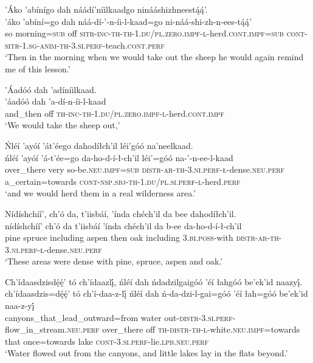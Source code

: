 \ea\label{ex:text6-2-12}
’Áko ’abínígo dah náádí’níilkaadgo ninááshizhneestą́ą́’.\\
\gll ’áko	’abíní=go	dah	náá-dí-’-n-íi-l-kaad=go	ni-náá-shi-zh-n-ees-tą́ą́’\\
     so	morning=\textsc{sub}	off	\textsc{sitr}-\textsc{inc}-\textsc{th}-\textsc{th}-1.\textsc{du}/\textsc{pl}.\textsc{zero}.\textsc{impf}-\textsc{l}-herd.\textsc{cont}.\textsc{impf}=\textsc{sub}	\textsc{cont}-\textsc{sitr}-1.\textsc{sg}-\textsc{anim}-\textsc{th}-3.\textsc{si}.\textsc{perf}-teach.\textsc{cont}.\textsc{perf}\\
\glt `Then in the morning when we would take out the sheep he would again remind me of this lesson.'
\z

\ea\label{ex:text6-3-1}
’Áadóó dah ’adíníilkaad.\\
\gll ’áadóó	dah	’a-dí-n-íi-l-kaad\\
     and\_then	off	\textsc{th}-\textsc{inc}-\textsc{th}-1.\textsc{du}/\textsc{pl}.\textsc{zero}.\textsc{impf}-\textsc{l}-herd.\textsc{cont}.\textsc{impf}\\
\glt `We would take the sheep out,'
\z

\ea\label{ex:text6-3-2}
Ńléí ’ayóí ’át’éego dahodíłch’il léi’góó na’neelkaad.\\
\gll ńléí	’ayóí	’á-t’ée=go	da-ho-d-í-ł-ch’il	léi’=góó	na-’-n-ee-l-kaad\\
     over\_there	very	so-be.\textsc{neu}.\textsc{impf}=\textsc{sub}	\textsc{distr}-\textsc{ar}-\textsc{th}-3.\textsc{ni}.\textsc{perf}-\textsc{ł}-dense.\textsc{neu}.\textsc{perf}	a\_certain=towards	\textsc{cont}-\textsc{nsp}.\textsc{sbj}-\textsc{th}-1.\textsc{du}/\textsc{pl}.\textsc{si}.\textsc{perf}-\textsc{l}-herd.\textsc{perf}\\
\glt `and we would herd them in a real wilderness area.'
\z

\ea\label{ex:text6-3-3}
Nídíshchíí’, ch’ó da, t’iisbáí, ’índa chéch’il da bee dahodíłch’il.\\
\gll nídíshchíí’	ch’ó	da	t’iisbáí	’índa	chéch’il	da	b-ee	da-ho-d-í-ł-ch’il\\
     pine	spruce	including	aspen	then	oak	including	3.\textsc{bi}.\textsc{poss}-with	\textsc{distr}-\textsc{ar}-\textsc{th}-3.\textsc{ni}.\textsc{perf}-\textsc{ł}-dense.\textsc{neu}.\textsc{perf}\\
\glt `These areas were dense with pine, spruce, aspen and oak.'
\z

\ea\label{ex:text6-3-4}
Ch’ídaasdzisdę́ę́’ tó ch’ídaazlį́, ńléí dah ńdadzilgaigóó ’éí łahgóó be’ek’id naazyį́.\\
\gll ch’ídaasdzis=dę́ę́’	tó	ch’í-daa-z-lį́	ńléí	dah	ń-da-dzi-l-gai=góó	’éí	łah=góó	be’ek’id	naa-z-yį́\\
     canyons\_that\_lead\_outward=from	water	out-\textsc{distr}-3.\textsc{si}.\textsc{perf}-flow\_in\_stream.\textsc{neu}.\textsc{perf}	over\_there	off	\textsc{th}-\textsc{distr}-\textsc{th}-\textsc{l}-white.\textsc{neu}.\textsc{impf}=towards	that	once=towards	lake	\textsc{cont}-3.\textsc{si}.\textsc{perf}-lie.\textsc{lpb}.\textsc{neu}.\textsc{perf}\\
\glt `Water flowed out from the canyons, and little lakes lay in the flats beyond.'
\z

